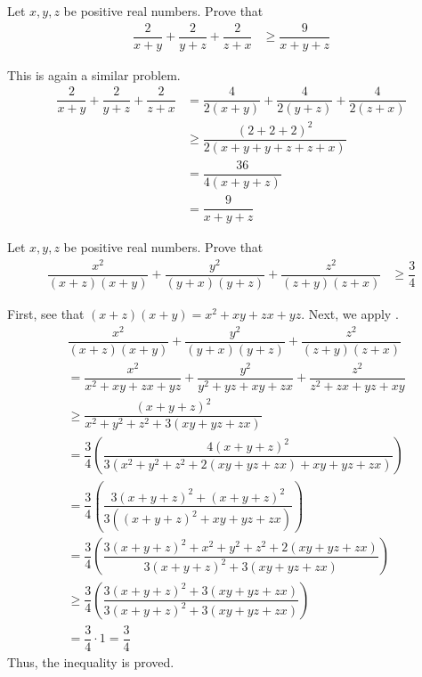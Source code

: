\documentclass{subfile}
\begin{document}
		\begin{problem}
			Let $x,y,z$ be positive real numbers. Prove that
				\begin{align*}
					\dfrac{2}{x+y}+\dfrac{2}{y+z}+\dfrac{2}{z+x}
						& \geq \dfrac{9}{x+y+z}
				\end{align*}
			
				\begin{solution}
					This is again a similar problem.
						\begin{align*}
							\dfrac{2}{x+y}+\dfrac{2}{y+z}+\dfrac{2}{z+x}
								& = \dfrac{4}{2(x+y)}+\dfrac{4}{2(y+z)}+\dfrac{4}{2(z+x)}\\
								& \geq \dfrac{(2+2+2)^{2}}{2(x+y+y+z+z+x)}\\
								& = \dfrac{36}{4(x+y+z)}\\
								& = \dfrac{9}{x+y+z}
						\end{align*}
				\end{solution}
		\end{problem}
	
		\begin{problem}
			Let $x,y,z$ be positive real numbers. Prove that
				\begin{align*}
					\dfrac{x^{2}}{(x+z)(x+y)}+\dfrac{y^{2}}{(y+x)(y+z)}+\dfrac{z^{2}}{(z+y)(z+x)}
						& \geq \dfrac{3}{4}
				\end{align*}
			
				\begin{solution}
					First, see that $(x+z)(x+y)=x^{2}+xy+zx+yz$. Next, we apply \nameref{thm:engel}.
						\begin{align*}
								& \dfrac{x^{2}}{(x+z)(x+y)}+\dfrac{y^{2}}{(y+x)(y+z)}+\dfrac{z^{2}}{(z+y)(z+x)}\\
								& = \dfrac{x^{2}}{x^{2}+xy+zx+yz}+\dfrac{y^{2}}{y^{2}+yz+xy+zx}+\dfrac{z^{2}}{z^{2}+zx+yz+xy}\\
								& \geq \dfrac{(x+y+z)^{2}}{x^{2}+y^{2}+z^{2}+3(xy+yz+zx)}\\
								& = \dfrac{3}{4}\left(\dfrac{4(x+y+z)^{2}}{3(x^{2}+y^{2}+z^{2}+2(xy+yz+zx)+xy+yz+zx)}\right)\\
								& = \dfrac{3}{4}\left(\dfrac{3(x+y+z)^{2}+(x+y+z)^{2}}{3((x+y+z)^{2}+xy+yz+zx)}\right)\\
								& = \dfrac{3}{4}\left(\dfrac{3(x+y+z)^{2}+x^{2}+y^{2}+z^{2}+2(xy+yz+zx)}{3(x+y+z)^{2}+3(xy+yz+zx)}\right)\\
								& \geq \dfrac{3}{4}\left(\dfrac{3(x+y+z)^{2}+3(xy+yz+zx)}{3(x+y+z)^{2}+3(xy+yz+zx)}\right)\\
								& = \dfrac{3}{4}\cdot1=\dfrac{3}{4}
						\end{align*}
					Thus, the inequality is proved.
				\end{solution}
		\end{problem}
	
\end{document}
